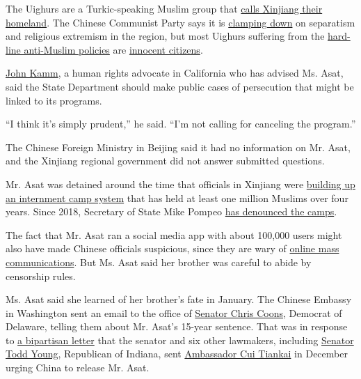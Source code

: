 The Uighurs are a Turkic-speaking Muslim group that
\href{https://www.nytimes.com/2009/07/12/weekinreview/12wong.html}{calls
Xinjiang their homeland}. The Chinese Communist Party says it is
\href{https://www.nytimes.com/2019/12/30/world/asia/china-xinjiang-muslims-labor.html}{clamping
down} on separatism and religious extremism in the region, but most
Uighurs suffering from the
\href{https://www.nytimes.com/2019/05/22/world/asia/china-surveillance-xinjiang.html}{hard-line
anti-Muslim policies} are
\href{https://www.nytimes.com/2019/12/28/world/asia/china-xinjiang-children-boarding-schools.html}{innocent
citizens}.

\href{https://duihua.org/team_member/john-kamm/}{John Kamm}, a human
rights advocate in California who has advised Ms. Asat, said the State
Department should make public cases of persecution that might be linked
to its programs.

``I think it's simply prudent,'' he said. ``I'm not calling for
canceling the program.''

The Chinese Foreign Ministry in Beijing said it had no information on
Mr. Asat, and the Xinjiang regional government did not answer submitted
questions.

Mr. Asat was detained around the time that officials in Xinjiang were
\href{https://www.nytimes.com/interactive/2019/11/16/world/asia/china-xinjiang-documents.html}{building
up an internment camp system} that has held at least one million Muslims
over four years. Since 2018, Secretary of State Mike Pompeo
\href{https://www.nytimes.com/2019/05/05/us/politics/pompeo-china-sanctions.html}{has
denounced the camps}.

The fact that Mr. Asat ran a social media app with about 100,000 users
might also have made Chinese officials suspicious, since they are wary
of
\href{https://www.nytimes.com/2019/01/10/business/china-twitter-censorship-online.html}{online
mass communications}. But Ms. Asat said her brother was careful to abide
by censorship rules.

Ms. Asat said she learned of her brother's fate in January. The Chinese
Embassy in Washington sent an email to the office of
\href{https://www.coons.senate.gov/}{Senator Chris Coons}, Democrat of
Delaware, telling them about Mr. Asat's 15-year sentence. That was in
response to
\href{https://int.nyt.com/data/documenthelper/6938-senators-ekpar-asat/b23f1159370b5d1ad5a8/optimized/full.pdf\#page=1}{a
bipartisan letter} that the senator and six other lawmakers, including
\href{https://www.young.senate.gov/}{Senator Todd Young}, Republican of
Indiana, sent
\href{https://www.nytimes.com/2020/04/05/opinion/coronavirus-china-us.html}{Ambassador
Cui Tiankai} in December urging China to release Mr. Asat.

